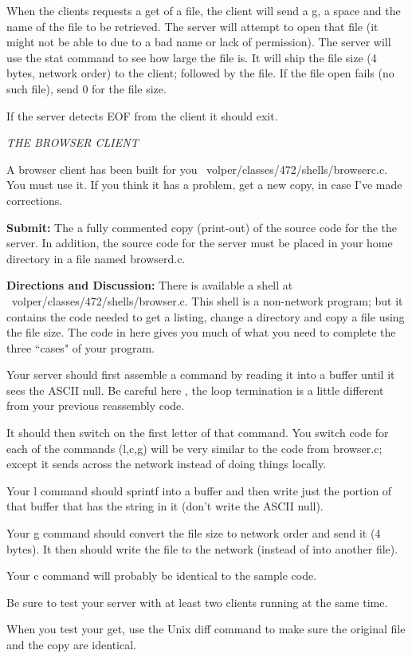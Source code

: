 When the clients requests a get of a file,
the client will send a g, a space and the name of the file to be retrieved. 
The server will attempt to open that file (it might not be able
to due to a bad name or lack of permission).
The server will use the {\ltt{}stat} command to see how large the
file is.
It will ship the file size (4 bytes, network order) to the client;
followed by the file.
If the file open fails (no such file), send 0 for the file size.

If the server detects EOF from the client it should exit.

{\it THE BROWSER CLIENT}

A browser client has been built for you
{\ltt{}~volper/classes/472/shells/browserc.c}.
You must use it.
If you think it has a problem, get a new copy, in case I've
made corrections. 

{\bf Submit:} The a fully commented copy (print-out) of the source code for the 
the server.
In addition,
the source code for the server must be placed in your home directory
in a file named {\ltt{}browserd.c}.

{\bf Directions and Discussion:} 
There is available a shell at
{\ltt{}~volper/classes/472/shells/browser.c}. 
This shell is a non-network program; but it
contains the code needed to get a listing, change
a directory and copy a file using the file size.
The code in here gives you much of what you need to
complete the three ``cases" of your program.

Your server should first assemble a command by reading it into a buffer
until it sees the ASCII null.
Be careful here , the loop termination is a little different from
your previous reassembly code.

It should then switch on the first letter of that command.
You switch code for each of the commands (l,c,g) will
be very similar to the code from browser.c; except
it sends across the network instead of doing things locally. 

Your l command should {\ltt{}sprintf} into
a buffer and then write just the portion of that buffer that
has the string in it (don't write the ASCII null).

Your g command should convert the file size to network order and
send it (4 bytes).
It then should  write the file to the network (instead of into
another file).

Your c command will probably be identical to the sample code.

Be sure to test your server with at least two clients running
at the same time.

When you test your get, use the Unix {\ltt{}diff} command
to make sure the original file and the copy are identical.
\bye
